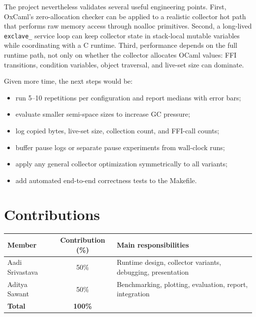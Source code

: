 \documentclass[11pt,a4paper]{article}
\begin{document}
The project nevertheless validates several useful engineering points.  First,
OxCaml's zero-allocation checker can be applied to a realistic collector hot
path that performs raw memory access through noalloc primitives.  Second, a
long-lived \texttt{exclave\_} service loop can keep collector state in
stack-local mutable variables while coordinating with a C runtime.  Third,
performance depends on the full runtime path, not only on whether the collector
allocates OCaml values: FFI transitions, condition variables, object traversal,
and live-set size can dominate.

Given more time, the next steps would be:
\begin{itemize}
  \item run 5--10 repetitions per configuration and report medians with error
  bars;
  \item evaluate smaller semi-space sizes to increase GC pressure;
  \item log copied bytes, live-set size, collection count, and FFI-call counts;
  \item buffer pause logs or separate pause experiments from wall-clock runs;
  \item apply any general collector optimization symmetrically to all variants;
  \item add automated end-to-end correctness tests to the Makefile.
\end{itemize}

\section*{Contributions}
\label{sec:contributions}

\begin{center}
\small
\begin{tabular}{@{}lcl@{}}
\toprule
\textbf{Member} & \textbf{Contribution (\%)} & \textbf{Main responsibilities} \\
\midrule
Aadi Srivastava & 50\% & Runtime design, collector variants, debugging, presentation \\
Aditya Sawant & 50\% & Benchmarking, plotting, evaluation, report, integration \\
\midrule
\textbf{Total} & \textbf{100\%} & \\
\bottomrule
\end{tabular}
\end{center}



\end{document}
